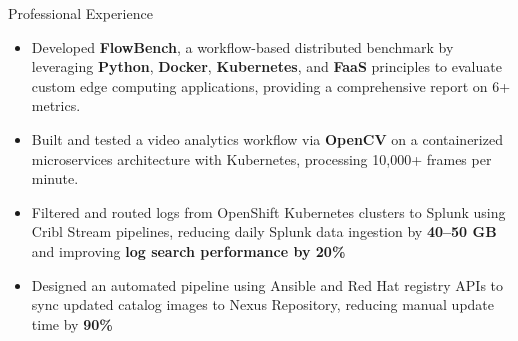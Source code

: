 \documentclass{resume}
\begin{document}
 \begin{experienceSection}{Professional Experience}
    \experienceItem[
        company={Arizona State University},
        location={Remote},
        position={Research Assistant, VISA Lab},
        duration={Jun 2025 - Present}
    ]
    \begin{itemize}
        \itemsep -6pt {}
        \item Developed \textbf{FlowBench}, a workflow-based distributed benchmark by leveraging \textbf{Python}, \textbf{Docker}, \textbf{Kubernetes}, and \textbf{FaaS} principles to evaluate custom edge computing applications, providing a comprehensive report on 6+ metrics.
        \item Built and tested a video analytics workflow via \textbf{OpenCV} on a containerized microservices architecture with Kubernetes, processing 10,000+ frames per minute.
    \end{itemize}

    \experienceItem[
        company={Arch Mortgage Insurance},
        location={Greensboro, NC},
        position={Site Reliability Engineer (SRE) Intern},
        duration={Jun 2024 - Aug 2024}
    ]
    \begin{itemize}
        \itemsep -6pt {}
        \item Filtered and routed logs from OpenShift Kubernetes clusters to Splunk using Cribl Stream pipelines, reducing daily Splunk data ingestion by \textbf{40–50 GB} and improving \textbf{log search performance by 20\%}
        \item Designed an automated pipeline using Ansible and Red Hat registry APIs to sync updated catalog images to Nexus Repository, reducing manual update time by \textbf{ 90\%}
        
    \end{itemize}


\end{experienceSection}
\end{document}
